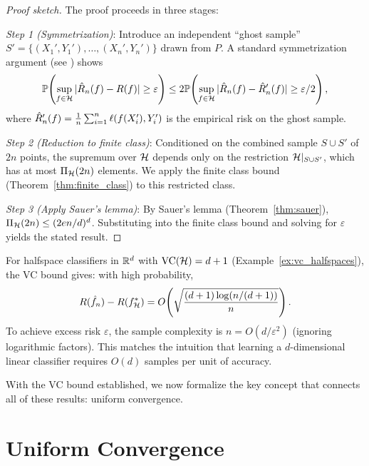 \documentclass[11pt,a4paper]{article}
\begin{document}
\begin{proof}[Proof sketch]
The proof proceeds in three stages:

\emph{Step 1 (Symmetrization)}: Introduce an independent ``ghost
sample'' $S' = \{(X_1', Y_1'), \ldots, (X_n', Y_n')\}$ drawn from $P$.
A standard symmetrization argument (see \citet[Chapter~4]{shalev2014})
shows
\[
    \mathbb{P}\!\left(\sup_{f \in \mathcal{H}} |\hat{R}_n(f) - R(f)|
    \geq \varepsilon\right)
    \leq 2 \mathbb{P}\!\left(\sup_{f \in \mathcal{H}}
    |\hat{R}_n(f) - \hat{R}_n'(f)| \geq \varepsilon/2\right),
\]
where $\hat{R}_n'(f) = \frac{1}{n}\sum_{i=1}^n
\ell(f(X_i'), Y_i')$ is the empirical risk on the ghost sample.

\emph{Step 2 (Reduction to finite class)}: Conditioned on the
combined sample $S \cup S'$ of $2n$ points, the supremum over
$\mathcal{H}$ depends only on the restriction $\mathcal{H}|_{S \cup S'}$,
which has at most $\Pi_{\mathcal{H}}(2n)$ elements.  We apply the finite
class bound (Theorem~\ref{thm:finite_class}) to this restricted
class.

\emph{Step 3 (Apply Sauer's lemma)}: By Sauer's lemma
(Theorem~\ref{thm:sauer}), $\Pi_{\mathcal{H}}(2n) \leq (2en/d)^d$.
Substituting into the finite class bound and solving for $\varepsilon$
yields the stated result.
\end{proof}

\begin{example}
\label{ex:vc_bound_halfspaces}
For halfspace classifiers in $\mathbb{R}^d$ with $\operatorname{VC}(\mathcal{H}) = d + 1$
(Example~\ref{ex:vc_halfspaces}), the VC bound gives: with high
probability,
\[
    R(\hat{f}_n) - R(f_{\mathcal{H}}^*)
    = O\!\left(\sqrt{\frac{(d+1) \log(n/(d+1))}{n}}\right).
\]
To achieve excess risk $\varepsilon$, the sample complexity is
$n = O(d/\varepsilon^2)$ (ignoring logarithmic factors).  This
matches the intuition that learning a $d$-dimensional linear
classifier requires $O(d)$ samples per unit of accuracy.
\end{example}

With the VC bound established, we now formalize the key concept
that connects all of these results: uniform convergence.


\section{Uniform Convergence}
\label{sec:uniform_convergence}
\end{document}
